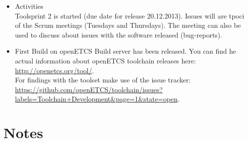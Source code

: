 \documentclass[a4paper, 11pt]{article}
\begin{document}
\begin{itemize}
\item Activities\\
Toolsprint 2 is started (due date for release 20.12.2013). Issues will are tpoci of the Scrum meetings (Tuesdays and Thursdays). The meeting can also be used to discuss about issues with the software released (bug-reports).

\item First Build on openETCS Build server has been released.
You can find he actual information about openETCS toolchain releases here:
\url{http://openetcs.org/tool/}.\\

For findings with the toolset make use of the issue tracker: \url{https://github.com/openETCS/toolchain/issues?labels=Toolchain+Development&page=1&state=open}.




\end{itemize}

\section{Notes}
\end{document}
